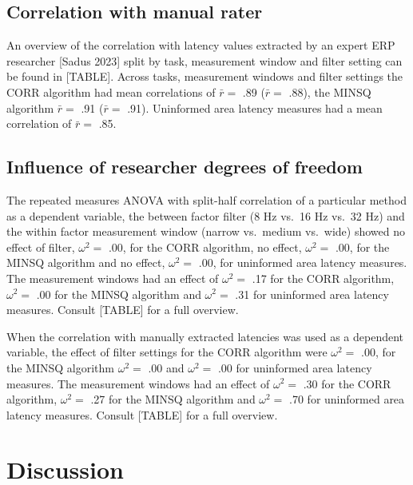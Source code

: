 \documentclass[
  man,floatsintext]{apa7}
\begin{document}
\hypertarget{correlation-with-manual-rater}{%
\subsection{Correlation with manual rater}\label{correlation-with-manual-rater}}

An overview of the correlation with latency values extracted by an expert ERP researcher {[}Sadus 2023{]} split by task, measurement window and filter setting can be found in {[}TABLE{]}. Across tasks, measurement windows and filter settings the CORR algorithm had mean correlations of \(\bar{r} =\) .89 (\(\bar{r} =\) .88), the MINSQ algorithm \(\bar{r} =\) .91 (\(\bar{r} =\) .91). Uninformed area latency measures had a mean correlation of \(\bar{r} =\) .85.

\hypertarget{influence-of-researcher-degrees-of-freedom}{%
\subsection{Influence of researcher degrees of freedom}\label{influence-of-researcher-degrees-of-freedom}}

The repeated measures ANOVA with split-half correlation of a particular method as a dependent variable, the between factor filter (8 Hz vs.~16 Hz vs.~32 Hz) and the within factor measurement window (narrow vs.~medium vs.~wide) showed no effect of filter, \(\omega^2 =\) .00, for the CORR algorithm, no effect, \(\omega^2 =\) .00, for the MINSQ algorithm and no effect, \(\omega^2 =\) .00, for uninformed area latency measures. The measurement windows had an effect of \(\omega^2 =\) .17 for the CORR algorithm, \(\omega^2 =\) .00 for the MINSQ algorithm and \(\omega^2 =\) .31 for uninformed area latency measures. Consult {[}TABLE{]} for a full overview.

When the correlation with manually extracted latencies was used as a dependent variable, the effect of filter settings for the CORR algorithm were \(\omega^2 =\) .00, for the MINSQ algorithm \(\omega^2 =\) .00 and \(\omega^2 =\) .00 for uninformed area latency measures. The measurement windows had an effect of \(\omega^2 =\) .30 for the CORR algorithm, \(\omega^2 =\) .27 for the MINSQ algorithm and \(\omega^2 =\) .70 for uninformed area latency measures. Consult {[}TABLE{]} for a full overview.

\hypertarget{discussion}{%
\section{Discussion}\label{discussion}}
\end{document}
